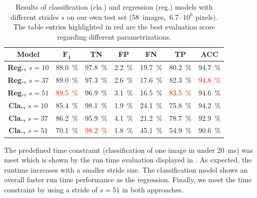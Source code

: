\begin{table}[]
    \begin{center}
        \begin{tabular}{c|cccccc}
            \toprule
            \textbf{Model} & {\bf $\mathbf{F_1}$} & \textbf{TN} & \textbf{FP} & \textbf{FN} & \textbf{TP} & \textbf{ACC} \\
            \midrule
            \textbf{Reg., $s=10$} & \SI{88.0}{\percent} & \SI{97.8}{\percent} & \SI{2.2}{\percent}& \SI{19.7}{\percent}& \SI{80.2}{\percent}& \SI{94.7}{\percent}\\
            \textbf{Reg., $s=37$} & \SI{89.0}{\percent}& \SI{97.3}{\percent}& \SI{2.6}{\percent}& \SI{17.6}{\percent}& \SI{82.3}{\percent} &  \textcolor{red}{\SI{94.8}{\percent}}\\
            \textbf{Reg., $s=51$} & \textcolor{red}{\SI{89.5}{\percent}} &\SI{96.9}{\percent} & \SI{3.1}{\percent} & \SI{16.5}{\percent}& \textcolor{red}{\SI{83.5}{\percent}} & \SI{94.6}{\percent}\\
            \midrule
            \textbf{Cla., $s=10$} & \SI{85.4}{\percent} & \SI{98.1}{\percent}& \SI{1.9}{\percent}&\SI{24.1}{\percent} & \SI{75.8}{\percent} & \SI{94.2}{\percent}\\
            \textbf{Cla., $s=37$} & \SI{86.2}{\percent}& \SI{95.9}{\percent} & \SI{4.1}{\percent} & \SI{21.2}{\percent} & \SI{78.7}{\percent} & \SI{92.9}{\percent}\\
            \textbf{Cla., $s=51$} & \SI{70.1}{\percent} & \textcolor{red}{\SI{98.2}{\percent}} & \SI{1.8}{\percent} & \SI{45.1}{\percent} & \SI{54.9}{\percent} & \SI{90.6}{\percent}\\
            \bottomrule
        \end{tabular}
        \caption{Results of classification (cla.) and regression (reg.) models
                 with different strides $s$ on our own test set (58~images,
                 $ ~6.7 \cdot 10^6$ pixels). The table entries highlighted in
                 red are the best evaluation score regarding different parametrizations.}
        \label{tab:ownapproach}
    \end{center}
\end{table}



The predefined time constraint (classification of
one image in under \SI{20}{\milli\second}) was meet which is shown by the run time evaluation
displayed in . As expected, the runtime increases with a
smaller stride size. The classification model shows an overall faster run time
performance as the regression. Finally, we meet the time constraint 
by using a stride of $s=51$ in both approaches.

